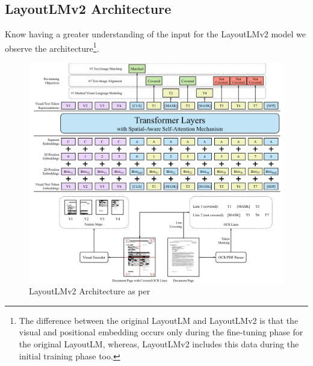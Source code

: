 \subsection{LayoutLMv2 Architecture}
Know having a greater understanding of the input for the LayoutLMv2 model we observe the architecture\footnote{The difference between the original LayoutLM and LayoutLMv2
	is that the visual and positional embedding occurs only during the fine-tuning phase for the original LayoutLM, whereas, LayoutLMv2 includes this
	data during the initial training phase too.}.
\begin{figure}[H]
	\centering
	\includegraphics[width=1\textwidth]{figures/layoutlmv2_archi.png}
	\caption{LayoutLMv2 Architecture as per~\autocite{xuLayoutLMv2MultimodalPretraining2022}}
	\label{fig:layoutlmv2_archi}
\end{figure}

